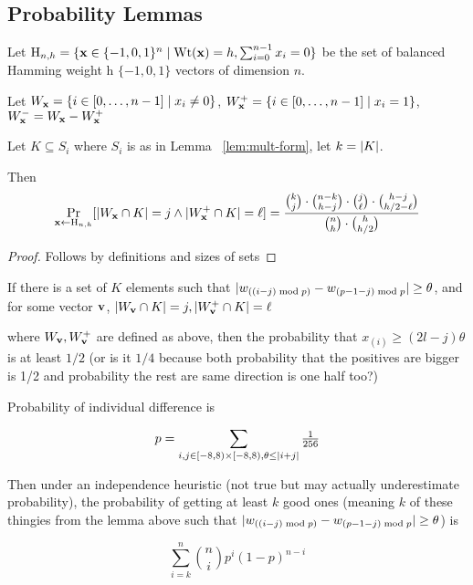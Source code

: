 \subsection{Probability Lemmas}
\label{sec:probability-lemmas}

\begin{lemma}
\label{lem:prob-hits}
Let $\text{H}_{n,h} = \{\mathbf{x} \in \{-1,0,1\}^{n} \mid \text{Wt}(\mathbf{x})=h,\sum_{i=0}^{n-1}x_i=0\}$ be the set of balanced Hamming weight h $\{-1,0,1\}$ vectors of dimension $n$.

Let $W_{\mathbf{x}} = \{i \in [0,\ldots,n-1] \mid x_{i} \neq 0\}$,
$W_{\mathbf{x}}^{+} = \{i \in [0,\ldots,n-1] \mid x_{i} = 1\}$,
$W_{\mathbf{x}}^{-}=W_{\mathbf{x}} - W_{\mathbf{x}}^{+}$ 





Let $K \subseteq S_{i}$ where $S_{i}$ is as in Lemma
~\ref{lem:mult-form}, let $k=\lvert K\rvert$. 


Then \[\Pr_{\mathbf{x} \gets \text{H}_{n,h}}[\lvert W_{\mathbf{x}} \cap K\rvert =
  j \wedge \lvert W_{\mathbf{x}}^{+} \cap K\rvert= \ell]
  =\frac{\binom{k}{j} \cdot \binom{n-k}{h-j} \cdot
    \binom{j}{\ell} \cdot \binom{h-j}{h/2-\ell}}{\binom{n}{h} \cdot \binom{h}{h/2}}\]
\end{lemma}

\begin{proof}
Follows by definitions and sizes of sets 
\end{proof}

\begin{conjecture}
If there is a set of $K$ elements such that
$\lvert w_{((i-j)\bmod{p})}-w_{(p-1-j)\bmod{p}}\rvert\geq \theta$, and for
some vector $\mathbf{v}$, 
$\lvert W_{\mathbf{v}} \cap K\rvert =
  j,\lvert W_{\mathbf{v}}^{+} \cap K\rvert= \ell$

where $W_{\mathbf{v}}, W_{\mathbf{v}}^{+}$ are defined as above, then the
probability that $x_{(i)} \geq (2l-j)\theta$ is at least $1/2$ (or is
it $1/4$ because both probability that the positives are bigger is 1/2
and probability the rest are same direction is one half too?)
\end{conjecture}

\begin{fact}
Probability of individual difference is 

\[p=\sum_{i,j \in [-8,8)\times [-8,8),\theta \leq \lvert i+j\rvert}\tfrac{1}{256}\]

Then under an independence heuristic (not true but may actually
underestimate probability), the probability of getting at least $k$
good  ones (meaning $k$ of these thingies from the lemma above such that  $\lvert w_{((i-j)\bmod{p})}-w_{(p-1-j)\bmod{p}}\rvert\geq \theta$)
is  

\[\sum_{i=k}^{n} \binom{n}{i}p^{i}(1-p)^{n-i}\]



\end{fact}

